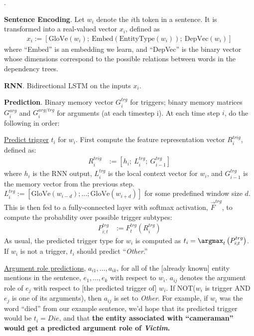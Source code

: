 \documentclass[11pt]{article}
\begin{document}
\myspace
\p {}. 
\begin{compactitem}[-]
	\item \textbf{Sentence Encoding}. Let $w_i$ denote the $i$th token in a sentence. It is transformed into a real-valued vector $x_i$, defined as
	\begin{align}
	x_i := \left[ \text{GloVe}(w_i);~ \text{Embed}(\text{EntityType}(w_i));~ \text{DepVec}(w_i)    \right]
	\end{align}
	where ``Embed'' is an embedding we learn, and ``DepVec'' is the binary vector whose dimensions correspond to the possible relations between words in the dependency trees. 
	
	\item \textbf{RNN}. Bidirectional LSTM on the inputs $x_i$. 
	
	\item \textbf{Prediction}. Binary memory vector $G_i^{trg}$ for triggers; binary memory matrices $G_i^{arg}$ and $G_i^{arg/trg}$ for arguments (at each timestep i). At each time step $i$, do the following in order:
	\begin{compactenum}
		\item \underline{Predict trigger} $t_i$ for $w_i$. First compute the feature representation vector $R_i^{trig}$, defined as:
		\begin{align}
		R_i^{trig} &:= \left[ h_i;~ L_i^{trg};~ G_{i-1}^{trg} \right]
		\end{align}
		where $h_i$ is the RNN output, $L_i^{trg}$ is the local context vector for $w_i$, and $G_{i-1}^{trg}$ is the memory vector from the previous step. $L_i^{trg} := [\text{GloVe}(w_{i-d}); \ldots; \text{GloVe}(w_{i + d})]$ for some predefined window size $d$. This is then fed to a fully-connected layer with softmax activation, $\vec{F}^{trg}$, to compute the probability over possible trigger subtypes:
		\begin{align}
		P_{i;t}^{trg} &:= F_t^{trg}(R_i^{trg})
		\end{align}
		As usual, the predicted trigger type for $w_i$ is computed as $t_i = \argmax_t \left( P_{i;t}^{trg} \right)$. If $w_i$ is not a trigger, $t_i$ should predict ``\textit{Other}.''
		
		\item \underline{Argument role predictions}, $a_{i1}, \ldots, a_{ik}$, for all of the [already known] entity mentions in the sentence, $e_1, \ldots, e_k$ with respect to $w_i$. $a_{ij}$ denotes the argument role of $e_j$ with respect to [the predicted trigger of] $w_i$. If NOT($w_i$ is trigger AND $e_j$ is one of its arguments), then $a_{ij}$ is set to \textit{Other}. For example, if $w_i$ was the word ``died'' from our example sentence, we'd hope that its predicted trigger would be $t_i = Die$, and that \textbf{the entity associated with ``cameraman'' would get a predicted argument role of \textit{Victim}.}
		

\end{compactenum}
\end{compactitem}
\end{document}
